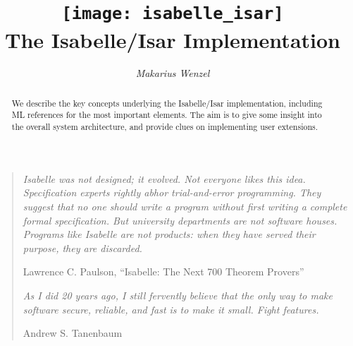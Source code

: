 \documentclass[12pt,a4paper,fleqn]{report}
\title{\texttt{[image: isabelle\_isar]}
  \\[4ex] The Isabelle/Isar Implementation}
\author{\emph{Makarius Wenzel}}
\begin{document}
\maketitle 

\begin{abstract}
  We describe the key concepts underlying the Isabelle/Isar
  implementation, including ML references for the most important
  elements.  The aim is to give some insight into the overall system
  architecture, and provide clues on implementing user extensions.
\end{abstract}

\vspace*{2.5cm}
\begin{quote}
  
  {\small\em Isabelle was not designed; it evolved.  Not everyone
    likes this idea.  Specification experts rightly abhor
    trial-and-error programming.  They suggest that no one should
    write a program without first writing a complete formal
    specification. But university departments are not software houses.
    Programs like Isabelle are not products: when they have served
    their purpose, they are discarded.}
  
  Lawrence C. Paulson, ``Isabelle: The Next 700 Theorem Provers''

  \vspace*{1cm}
  
  {\small\em As I did 20 years ago, I still fervently believe that the
    only way to make software secure, reliable, and fast is to make it
    small.  Fight features.}
  
  Andrew S. Tanenbaum

\end{quote}

\thispagestyle{empty}\clearpage

 \tableofcontents \clearfirst









\appendix


\begingroup
\tocentry{\bibname}
 \small\raggedright\frenchspacing

\endgroup

\tocentry{\glossaryname}
\printglossary

\tocentry{\indexname}
\printindex
\end{document}
